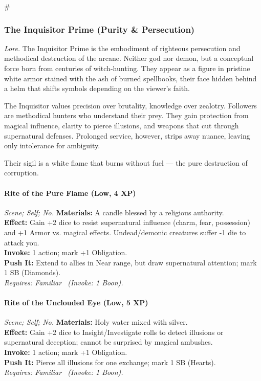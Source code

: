 # %

\subsubsection{The Inquisitor Prime (Purity \& Persecution)}
\textit{Lore.} The Inquisitor Prime is the embodiment of righteous persecution and methodical destruction of the arcane. Neither god nor demon, but a conceptual force born from centuries of witch-hunting. They appear as a figure in pristine white armor stained with the ash of burned spellbooks, their face hidden behind a helm that shifts symbols depending on the viewer's faith.

The Inquisitor values precision over brutality, knowledge over zealotry. Followers are methodical hunters who understand their prey. They gain protection from magical influence, clarity to pierce illusions, and weapons that cut through supernatural defenses. Prolonged service, however, strips away nuance, leaving only intolerance for ambiguity.

Their sigil is a white flame that burns without fuel --- the pure destruction of corruption.

\paragraph*{Rite of the Pure Flame (Low, 4 XP)} \emph{Scene; Self; No.}
\textbf{Materials:} A candle blessed by a religious authority.\\
\textbf{Effect:} Gain +2 dice to resist supernatural influence (charm, fear, possession) and +1 Armor vs. magical effects. Undead/demonic creatures suffer -1 die to attack you.\\
\textbf{Invoke:} 1 action; mark +1 Obligation.\\
\textbf{Push It:} Extend to allies in Near range, but draw supernatural attention; mark 1 SB (Diamonds).\\
\emph{Requires: Familiar \ (\textit{Invoke:} 1 Boon).}

\paragraph*{Rite of the Unclouded Eye (Low, 5 XP)} \emph{Scene; Self; No.}
\textbf{Materials:} Holy water mixed with silver.\\
\textbf{Effect:} Gain +2 dice to Insight/Investigate rolls to detect illusions or supernatural deception; cannot be surprised by magical ambushes.\\
\textbf{Invoke:} 1 action; mark +1 Obligation.\\
\textbf{Push It:} Pierce all illusions for one exchange; mark 1 SB (Hearts).\\
\emph{Requires: Familiar \ (\textit{Invoke:} 1 Boon).}

